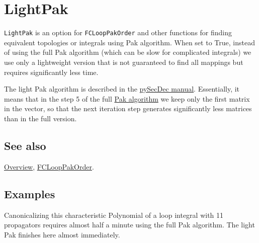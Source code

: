 \documentclass[../FeynCalcManual.tex]{subfiles}
\begin{document}
\hypertarget{lightpak}{%
\section{LightPak}\label{lightpak}}

\texttt{LightPak} is an option for \texttt{FCLoopPakOrder} and other
functions for finding equivalent topologies or integrals using Pak
algorithm. When set to True, instead of using the full Pak algorithm
(which can be slow for complicated integrals) we use only a lightweight
version that is not guaranteed to find all mappings but requires
significantly less time.

The light Pak algorithm is described in the
\href{https://secdec.readthedocs.io/en/stable/full_reference.html}{pySecDec
manual}. Essentially, it means that in the step 5 of the full
\href{https://arxiv.org/pdf/1111.0868.pdf}{Pak algorithm} we keep only
the first matrix in the vector, so that the next iteration step
generates significantly less matrices than in the full version.

\subsection{See also}

\hyperlink{toc}{Overview}, \hyperlink{fclooppakorder}{FCLoopPakOrder}.

\subsection{Examples}

Canonicalizing this characteristic Polynomial of a loop integral with 11
propagators requires almost half a minute using the full Pak algorithm.
The light Pak finishes here almost immediately.
\end{document}
